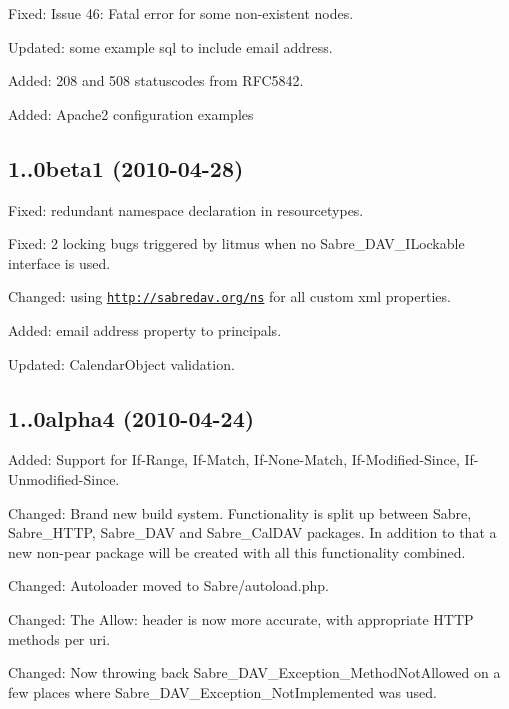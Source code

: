 \begin{DoxyItemize}
\item Fixed\+: Issue 46\+: Fatal error for some non-\/existent nodes.
\item Updated\+: some example sql to include email address.
\item Added\+: 208 and 508 statuscodes from R\+F\+C5842.
\item Added\+: Apache2 configuration examples
\end{DoxyItemize}

\subsection*{1..\+0beta1 (2010-\/04-\/28) }


\begin{DoxyItemize}
\item Fixed\+: redundant namespace declaration in resourcetypes.
\item Fixed\+: 2 locking bugs triggered by litmus when no Sabre\+\_\+\+D\+A\+V\+\_\+\+I\+Lockable interface is used.
\item Changed\+: using \href{http://sabredav.org/ns}{\tt http\+://sabredav.\+org/ns} for all custom xml properties.
\item Added\+: email address property to principals.
\item Updated\+: Calendar\+Object validation.
\end{DoxyItemize}

\subsection*{1..\+0alpha4 (2010-\/04-\/24) }


\begin{DoxyItemize}
\item Added\+: Support for If-\/\+Range, If-\/\+Match, If-\/\+None-\/\+Match, If-\/\+Modified-\/\+Since, If-\/\+Unmodified-\/\+Since.
\item Changed\+: Brand new build system. Functionality is split up between Sabre, Sabre\+\_\+\+H\+T\+TP, Sabre\+\_\+\+D\+AV and Sabre\+\_\+\+Cal\+D\+AV packages. In addition to that a new non-\/pear package will be created with all this functionality combined.
\item Changed\+: Autoloader moved to Sabre/autoload.\+php.
\item Changed\+: The Allow\+: header is now more accurate, with appropriate H\+T\+TP methods per uri.
\item Changed\+: Now throwing back Sabre\+\_\+\+D\+A\+V\+\_\+\+Exception\+\_\+\+Method\+Not\+Allowed on a few places where Sabre\+\_\+\+D\+A\+V\+\_\+\+Exception\+\_\+\+Not\+Implemented was used.
\end{DoxyItemize}

